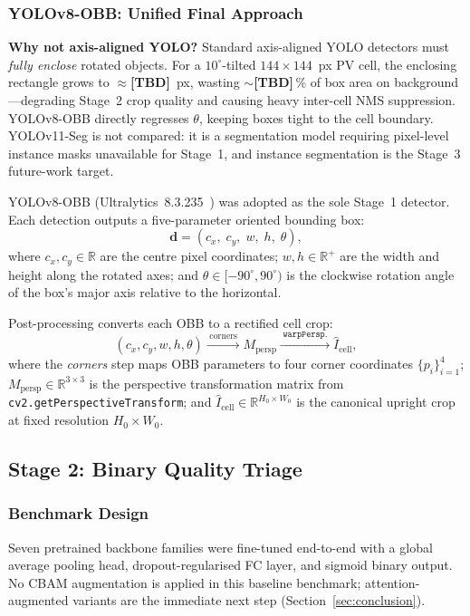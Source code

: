 \documentclass[conference]{IEEEtran}
\begin{document}
\subsubsection{YOLOv8-OBB: Unified Final Approach}
\label{sec:yolo}

\textbf{Why not axis-aligned YOLO?} Standard axis-aligned YOLO detectors must \textit{fully enclose} rotated objects. For a $10^\circ$-tilted $144\times144$~px PV cell, the enclosing rectangle grows to $\approx$\textbf{[TBD]}~px, wasting $\sim$\textbf{[TBD]}\,\% of box area on background---degrading Stage~2 crop quality and causing heavy inter-cell NMS suppression. YOLOv8-OBB directly regresses $\theta$, keeping boxes tight to the cell boundary. YOLOv11-Seg is not compared: it is a segmentation model requiring pixel-level instance masks unavailable for Stage~1, and instance segmentation is the Stage~3 future-work target.

YOLOv8-OBB (Ultralytics~8.3.235~\cite{jocher2023}) was adopted as the sole Stage~1 detector. Each detection outputs a five-parameter oriented bounding box:
\begin{equation}
  \mathbf{d} = (c_x,\; c_y,\; w,\; h,\; \theta),
  \label{eq:obb}
\end{equation}
where $c_x, c_y \in \mathbb{R}$ are the centre pixel coordinates; $w, h \in \mathbb{R}^{+}$ are the width and height along the rotated axes; and $\theta \in [-90^\circ, 90^\circ)$ is the clockwise rotation angle of the box's major axis relative to the horizontal.

Post-processing converts each OBB to a rectified cell crop:
\begin{equation}
  (c_x, c_y, w, h, \theta)
  \xrightarrow{\;\text{corners}\;}
  M_{\text{persp}}
  \xrightarrow{\;\texttt{warpPersp.}\;}
  \hat{I}_{\text{cell}},
  \label{eq:postproc}
\end{equation}
where the \textit{corners} step maps OBB parameters to four corner coordinates $\{p_i\}_{i=1}^{4}$; $M_{\text{persp}} \in \mathbb{R}^{3\times3}$ is the perspective transformation matrix from \texttt{cv2.getPerspectiveTransform}; and $\hat{I}_{\text{cell}} \in \mathbb{R}^{H_0 \times W_0}$ is the canonical upright crop at fixed resolution $H_0 \times W_0$.

\subsection{Stage 2: Binary Quality Triage}
\label{sec:stage2}

\subsubsection{Benchmark Design}
Seven pretrained backbone families were fine-tuned end-to-end with a global average pooling head, dropout-regularised FC layer, and sigmoid binary output. No CBAM augmentation is applied in this baseline benchmark; attention-augmented variants are the immediate next step (Section~\ref{sec:conclusion}).
\end{document}
